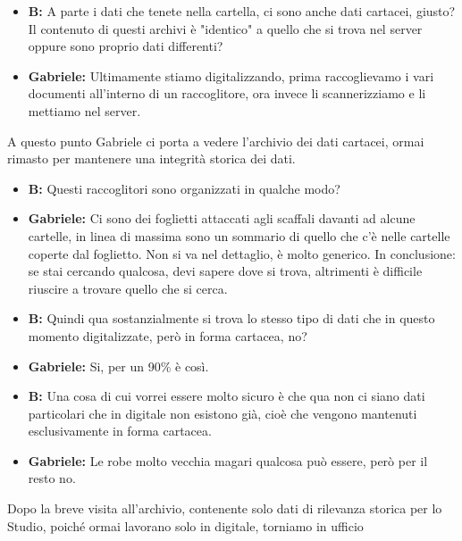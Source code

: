 \documentclass{elegantbook}
\begin{document}
\begin{itemize}
		\item\textbf{B}\textbf{:} A parte i dati che tenete nella cartella, ci sono anche dati cartacei, giusto? Il contenuto di questi archivi è "identico" a
                    quello che si trova nel server oppure sono proprio dati differenti?
		\item\textbf{Gabriele}\textbf{:} Ultimamente stiamo digitalizzando, prima raccoglievamo i vari documenti all'interno di un raccoglitore, ora invece li
                    scannerizziamo e li mettiamo nel server.
                \\
	\end{itemize}
	A questo punto Gabriele ci porta a vedere l'archivio dei dati cartacei, ormai rimasto per mantenere una integrità storica dei dati.
        \\
	\begin{itemize}
		\item\textbf{B}\textbf{:} Questi raccoglitori sono organizzati in qualche modo?
		\item\textbf{Gabriele}\textbf{:} Ci sono dei foglietti attaccati agli scaffali davanti ad alcune cartelle, in linea di massima sono un sommario di quello
                    che c'è nelle cartelle coperte dal foglietto. Non si va nel dettaglio, è molto generico. In conclusione: se stai cercando qualcosa, devi sapere dove si
                    trova, altrimenti è difficile riuscire a trovare quello che si cerca.
		\item\textbf{B}\textbf{:} Quindi qua sostanzialmente si trova lo stesso tipo di dati che in questo momento digitalizzate, però in forma cartacea, no?
		\item\textbf{Gabriele}\textbf{:} Si, per un 90\% è così.
		\item\textbf{B}\textbf{:} Una cosa di cui vorrei essere molto sicuro è che qua non ci siano dati particolari che in digitale non esistono già, cioè che
                    vengono mantenuti esclusivamente in forma cartacea.
		\item\textbf{Gabriele}\textbf{:} Le robe molto vecchia magari qualcosa può essere, però per il resto no.
                \\
	\end{itemize}
	Dopo la breve visita all'archivio, contenente solo dati di rilevanza storica per lo Studio, poiché ormai lavorano solo in digitale, torniamo in ufficio
        \\
\end{document}
